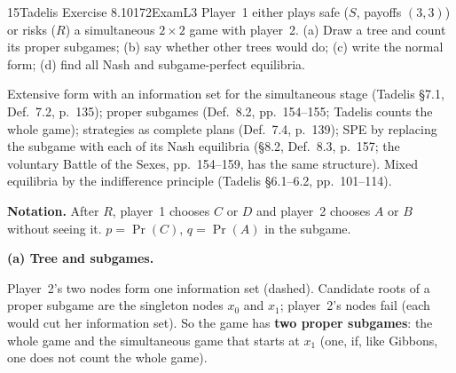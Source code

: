 \begin{exsol}{15}{Tadelis Exercise 8.10}{172}{Exam}{L3}
\asked Player~1 either plays safe ($S$, payoffs $(3,3)$) or risks ($R$) a simultaneous
$2\times2$ game with player~2. (a) Draw a tree and count its proper subgames; (b) say whether
other trees would do; (c) write the normal form; (d) find all Nash and subgame-perfect equilibria.

\method Extensive form with an information set for the simultaneous stage (Tadelis \S7.1,
Def.~7.2, p.~135); proper subgames (Def.~8.2, pp.~154--155; Tadelis counts the whole game);
strategies as complete plans (Def.~7.4, p.~139); SPE by replacing the subgame with each of its
Nash equilibria (\S8.2, Def.~8.3, p.~157; the voluntary Battle of the Sexes, pp.~154--159, has the
same structure). Mixed equilibria by the indifference principle (Tadelis \S6.1--6.2, pp.~101--114).

\solution
\textbf{Notation.} After $R$, player~1 chooses $C$ or $D$ and player~2 chooses $A$ or $B$
without seeing it. $p = \Pr(C)$, $q = \Pr(A)$ in the subgame.

\textbf{(a) Tree and subgames.}
\begin{center}
\end{center}
Player~2's two nodes form one information set (dashed). Candidate roots of a proper subgame are
the singleton nodes $x_0$ and $x_1$; player~2's nodes fail (each would cut her information
set). So the game has \textbf{two proper subgames}: the whole game and the simultaneous game that
starts at $x_1$ (one, if, like Gibbons, one does not count the whole game).


\end{exsol}
